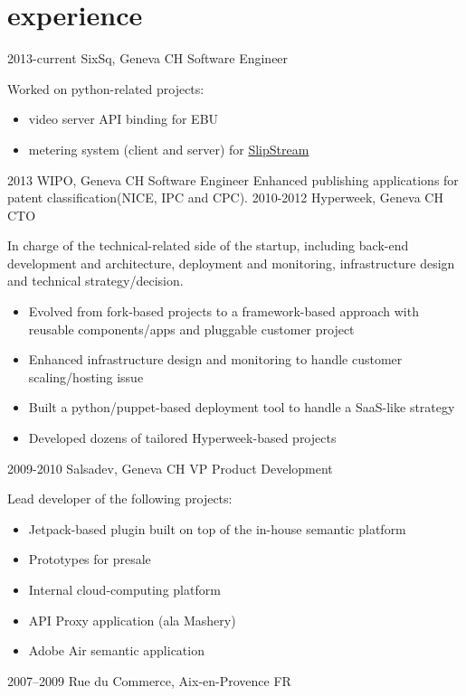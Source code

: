 \documentclass[]{friggeri}
\begin{document}
\section{experience}

\begin{entrylist}
  \entry
    {2013-current}
    {SixSq, Geneva CH}
    {Software Engineer}
    {Worked on python-related projects:
    \begin{itemize}
    \item video server API binding for \ac{EBU}
    \item metering system (client and server) for
    \href{http://sixsq.com/products/slipstream.html}{SlipStream{\texttrademark}}
    \end{itemize}}
  \entry
    {2013}
    {\ac{WIPO}, Geneva CH}
    {Software Engineer}
    {Enhanced publishing applications for patent classification(NICE, IPC
    and CPC).}
  \entry
    {2010-2012}
    {Hyperweek, Geneva CH}
    {CTO}
    {In charge of the technical-related side of the startup, including
    back-end development and architecture, deployment and monitoring,
    infrastructure design and technical strategy/decision.
    \begin{itemize}
    \item Evolved from fork-based projects to a framework-based approach with
    reusable components/apps and pluggable customer project
    \item Enhanced infrastructure design and monitoring to handle customer
    scaling/hosting issue
    \item Built a python/puppet-based deployment tool to handle a SaaS-like
    strategy
    \item Developed dozens of tailored Hyperweek-based projects
    \end{itemize}}
  \entry
    {2009-2010}
    {Salsadev, Geneva CH}
    {VP Product Development}
    {Lead developer of the following projects:
    \begin{itemize}
    \item Jetpack-based plugin built on top of the in-house semantic platform
    \item Prototypes for presale
    \item Internal cloud-computing platform
    \item API Proxy application (ala Mashery)
    \item Adobe Air semantic application
    \end{itemize}}
  \entry
    {2007–2009}
    {Rue du Commerce, Aix-en-Provence FR}

\end{entrylist}
\end{document}
